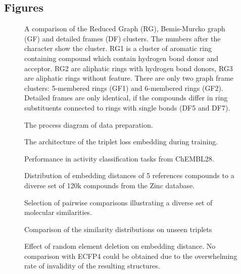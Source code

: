 \documentclass[doublespacing]{bmcart}
\begin{document}
\begin{backmatter}




\section*{Figures}

\begin{figure}[h!]
\caption{A comparison of the Reduced Graph (RG), Bemis-Murcko graph (GF) and detailed frames (DF) clusters. The numbers after the character show the cluster. RG1 is a cluster of aromatic ring containing compound which contain hydrogen bond donor and acceptor. RG2 are aliphatic rings with hydrogen bond donors, RG3 are aliphatic rings without feature. There are only two graph frame clusters: 5-membered rings (GF1) and 6-membered rings (GF2). Detailed frames are only identical, if the compounds differ in ring substituents connected to rings with single bonds (DF5 and DF7).}
\label{fig:GF_DF_RG}
\end{figure}

\begin{figure}[h!]
\caption{The process diagram of data preparation.}
\label{fig:Process_Diagram}
\end{figure}

\begin{figure}[h!]
\caption{The architecture of the triplet loss embedding during training.}
\label{fig:triplet_arch}
\end{figure}
%
\begin{figure}[h!]
\caption{Performance in activity classification tasks from ChEMBL28.}
\label{fig:Kappa_ChEMBL}
\end{figure}

\begin{figure}[h!]
\caption{Distribution of embedding distances of 5 references compounds to a diverse set of 120k compounds from the Zinc database.}
\label{fig:References_distributions}
\end{figure}


\begin{figure}[h!]
\caption{Selection of pairwise comparisons illustrating a diverse set of molecular similarities.}
\label{fig:Similarity_study_cases}
\end{figure}
%
\begin{figure}[h!]
\caption{Comparison of the similarity distributions on unseen triplets}
\label{fig:ECFP4_Embedding_triplets}
\end{figure}

\begin{figure}[h!]
\caption{Effect of random element deletion on embedding distance. No comparison with ECFP4 could be obtained due to the overwhelming rate of invalidity of the resulting structures.}
\label{fig:Ablations}
\end{figure}

\end{backmatter}
\end{document}
